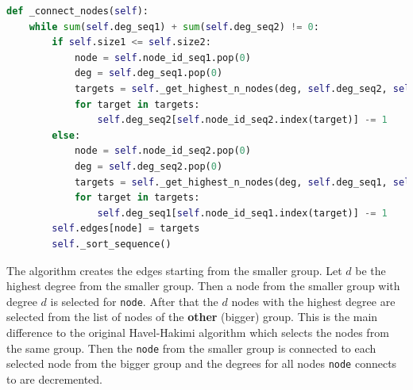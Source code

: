 \begin{lstlisting}[language=python, caption={Modified Havel-Hakimi algorithm}, label={lst:modified_havel_hakimi}]
def _connect_nodes(self):
    while sum(self.deg_seq1) + sum(self.deg_seq2) != 0:
        if self.size1 <= self.size2:
            node = self.node_id_seq1.pop(0)
            deg = self.deg_seq1.pop(0)
            targets = self._get_highest_n_nodes(deg, self.deg_seq2, self.node_id_seq2)
            for target in targets:
                self.deg_seq2[self.node_id_seq2.index(target)] -= 1
        else:
            node = self.node_id_seq2.pop(0)
            deg = self.deg_seq2.pop(0)
            targets = self._get_highest_n_nodes(deg, self.deg_seq1, self.node_id_seq1)
            for target in targets:
                self.deg_seq1[self.node_id_seq1.index(target)] -= 1
        self.edges[node] = targets
        self._sort_sequence()
\end{lstlisting}

The algorithm creates the edges starting from the smaller group. Let $d$ be the highest degree from the smaller group. Then a node from the smaller group with degree $d$ is selected for \texttt{node}. After that the $d$ nodes with the highest degree are selected from the list of nodes of the \textbf{other} (bigger) group. This is the main difference to the original Havel-Hakimi algorithm which selects the nodes from the same group. Then the \texttt{node} from the smaller group is connected to each selected node from the bigger group and the degrees for all nodes \texttt{node} connects to are decremented.